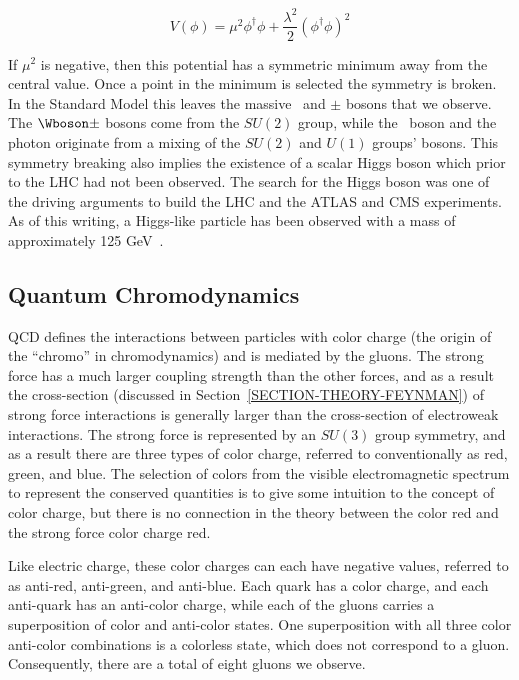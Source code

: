 \begin{equation}
V(\phi) = \mu^2\phi^\dagger\phi + \frac{\lambda^2}{2}\left(\phi^\dagger\phi\right)^2
\end{equation}

\noindent
If $\mu^2$ is negative, then this potential has a symmetric minimum away from the central value. Once a point in the minimum is selected the symmetry is broken. In the Standard Model this leaves the massive \Zboson\ and \Wboson$\pm$ bosons that we observe. The $\Wboson\pm$ bosons come from the $SU(2)$ group, while the \Zboson\ boson and the photon originate from a mixing of the $SU(2)$ and $U(1)$ groups' bosons. This symmetry breaking also implies the existence of a scalar Higgs boson which prior to the LHC had not been observed. The search for the Higgs boson was one of the driving arguments to build the LHC and the ATLAS and CMS experiments. As of this writing, a Higgs-like particle has been observed with a mass of approximately 125 GeV~\cite{HiggsATLAS, HiggsCMS}.

\subsection{Quantum Chromodynamics}
\label{SECTION-THEORY-QCD}
QCD defines the interactions between particles with color charge (the origin of the ``chromo'' in chromodynamics) and is mediated by the gluons. The strong force has a much larger coupling strength than the other forces, and as a result the cross-section (discussed in Section~\ref{SECTION-THEORY-FEYNMAN}) of strong force interactions is generally larger than the cross-section of electroweak interactions. The strong force is represented by an $SU(3)$ group symmetry, and as a result there are three types of color charge, referred to conventionally as red, green, and blue. The selection of colors from the visible electromagnetic spectrum to represent the conserved quantities is to give some intuition to the concept of color charge, but there is no connection in the theory between the color red and the strong force color charge red. 

Like electric charge, these color charges can each have negative values, referred to as anti-red, anti-green, and anti-blue. Each quark has a color charge, and each anti-quark has an anti-color charge, while each of the gluons carries a superposition of color and anti-color states. One superposition with all three color anti-color combinations is a colorless state, which does not correspond to a gluon.  Consequently, there are a total of eight gluons we observe. 


